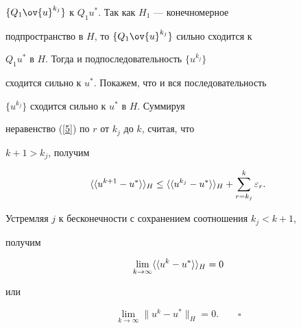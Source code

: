 $\{Q_1\ov{u}^{k_j}\}$ к $Q_1u^*$. Так как $H_1$ --- конечномерное


подпространство в $H$, то $\{Q_1\ov{u}^{k_j}\}$ сильно сходится к


$Q_1u^*$ в $H$. Тогда и подпоследовательность $\{{u}^{k_j}\}$


сходится сильно к $u^*$. Покажем, что и вся последовательность


$\{{u}^{k_j}\}$ сходится сильно к $u^*$ в $H$. Суммируя


неравенство (\ref{5}) по $r$ от $k_j$ до $k$, считая, что


$k+1>k_j$, получим


$$


\la\la u^{k+1}-u^*\ra\ra _H \le \la\la u^{k_j}-u^*\ra\ra _H+


\sum\limits_{r=k_j}^k\varepsilon_r.


$$


Устремляя $j$ к бесконечности с сохранением соотношения $k_j<k+1$,


получим


$$


\lim\limits_{k\to\infty}\la\la u^k-u^*\ra\ra _H=0


$$


или


$$


\lim\limits_{k\to\infty}\|u^k-u^*\|_H=0.\qquad\square


$$





